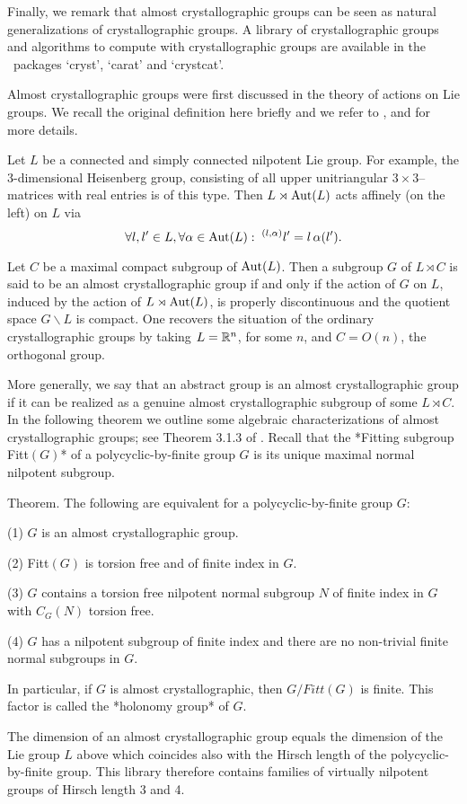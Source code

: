 Finally, we remark that almost crystallographic groups can be seen as natural 
generalizations of crystallographic groups. A library of crystallographic 
groups and algorithms to compute with crystallographic groups are available 
in the \GAP\ packages `cryst', `carat' and `crystcat'. 


Almost crystallographic groups were first discussed in the theory of 
actions on Lie groups.  We recall the original definition here briefly
and we refer to \cite{AUS}, \cite{KD} and \cite{LEE} for more details. 

Let $L$ be a connected and simply connected nilpotent Lie group. For 
example, the 3-dimensional Heisenberg group, consisting of all upper 
unitriangular $3\times3$--matrices with real entries is of this type.
Then $L\rtimes {\rm Aut}(L)$ acts affinely (on the left) on $L$ via
$$ \forall l,l'\in L,\forall \alpha \in {\rm Aut}(L):\; 
   ^{(l,\alpha)}l'=l \, \alpha(l').  $$

Let $C$ be a maximal compact subgroup of ${\rm Aut}(L)$. Then a subgroup $G$ 
of $L \rtimes C$ is said to be an almost crystallographic group if and only 
if the action of $G$ on $L$, induced by the action of $L\rtimes {\rm Aut}(L)$,
is properly discontinuous and the quotient space $G \backslash L$ is compact. 
One recovers the situation of the ordinary crystallographic groups by taking 
$L={\Bbb R}^n$, for some $n$, and $C=O(n)$, the orthogonal group.

More generally, we say that an abstract group is an almost crystallographic
group if it can be realized as a genuine almost crystallographic subgroup 
of some $L \rtimes C$. In the following theorem we outline some algebraic 
characterizations of almost crystallographic groups; see Theorem 3.1.3 of 
\cite{KD}. Recall that the *Fitting subgroup Fitt$(G)$* of a 
polycyclic-by-finite group $G$ is its unique maximal normal nilpotent 
subgroup.

\proclaim Theorem. 
The following are equivalent for a polycyclic-by-finite group $G$:
\parindent  30pt
\item{(1)} $G$ is an almost crystallographic group.
\item{(2)} Fitt$(G)$ is torsion free and of finite index in $G$.
\item{(3)} $G$ contains a torsion free nilpotent normal subgroup $N$
of finite index in $G$ with $C_G(N)$ torsion free.
\item{(4)} $G$ has a nilpotent subgroup of finite index and there
are no non-trivial finite normal subgroups in $G$.
\medskip
\parindent 0pt

In particular, if $G$ is almost crystallographic, then $G / Fitt(G)$
is finite. This factor is called the *holonomy group* of $G$. 

The dimension of an almost crystallographic group equals the dimension
of the Lie group $L$ above which coincides also with the Hirsch length 
of the polycyclic-by-finite group. This library therefore contains 
families of virtually nilpotent groups of Hirsch length 3 and 4. 

